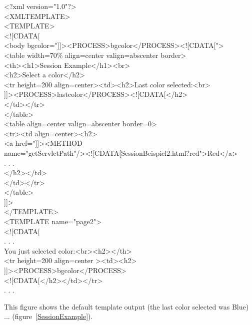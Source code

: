 \begin{java}
<?xml version="1.0"?>\\
<XMLTEMPLATE>\\
<TEMPLATE>\\
<![CDATA[\\
<body bgcolor="]]><PROCESS>bgcolor</PROCESS><![CDATA[">\\
<table width=70\% align=center valign=abscenter border>\\
<th><h1>Session Example</h1><br>\\
<h2>Select a color</h2>\\
<tr height=200 align=center><td><h2>Last color selected:<br>\\
]]><PROCESS>lastcolor</PROCESS><![CDATA[</h2>\\
</td></tr>\\
</table>\\
<table align=center valign=abscenter border=0>\\
<tr><td align=center><h2>\\
\jtabc        <a href="]]><METHOD\\
name="getServletPath"/><![CDATA[SessionBeispiel2.html?red">Red</a>\\
. . .\\
\jtabc        </h2></td>\\
</td></tr>\\
</table>\\
]]>\\
</TEMPLATE>\\
<TEMPLATE name="page2">\\
<![CDATA[\\
\jtabb     . . .\\
You just selected color:<br><h2></th>\\
\jtabc        <tr height=200 align=center ><td><h2>\\
\jtabc        ]]><PROCESS>bgcolor</PROCESS>\\
\jtabc        <![CDATA[</h2></td></tr>\\
\jtabb     . . .\\
\end{java}

This figure shows the default template output (the last color selected
was Blue) ... (figure~\ref{SessionExample}).

